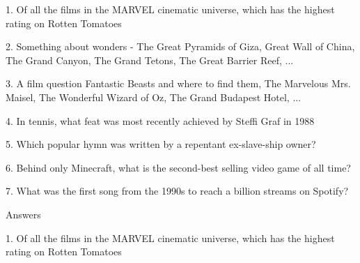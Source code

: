 \begin{frame}
\begin{center}
\Large
1. Of all the films in the MARVEL cinematic universe, which has the highest rating on Rotten Tomatoes
\end{center}
\end{frame}
\begin{frame}
\begin{center}
\Large
2. Something about wonders - The Great Pyramids of Giza, Great Wall of China, The Grand Canyon, The Grand Tetons, The Great Barrier Reef, ...
\end{center}
\end{frame}
\begin{frame}
\begin{center}
\Large
3. A film question Fantastic Beasts and where to find them, The Marvelous Mrs. Maisel, The Wonderful Wizard of Oz, The Grand Budapest Hotel, ...
\end{center}
\end{frame}
\begin{frame}
\begin{center}
\Large
4. In tennis, what feat was most recently achieved by Steffi Graf in 1988
\end{center}
\end{frame}
\begin{frame}
\begin{center}
\Large
5. Which popular hymn was written by a repentant ex-slave-ship owner?
\end{center}
\end{frame}
\begin{frame}
\begin{center}
\Large
6. Behind only Minecraft, what is the second-best selling video game of all time?
\end{center}
\end{frame}
\begin{frame}
\begin{center}
\Large
7. What was the first song from the 1990s to reach a billion streams on Spotify?
\end{center}
\end{frame}
\begin{frame}
\begin{center}
\Huge
Answers
\end{center}
\end{frame}
\begin{frame}
\begin{center}
\Large
1. Of all the films in the MARVEL cinematic universe, which has the highest rating on Rotten Tomatoes
\\
\end{center}
\end{frame}
